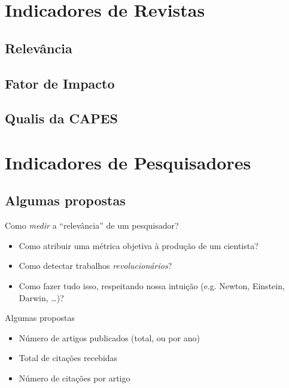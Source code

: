 \documentclass{beamer}
\begin{document}
\section{Indicadores de Revistas}

\subsection{Relevância}

\subsection{Fator de Impacto}

\subsection{Qualis da CAPES}

\section{Indicadores de Pesquisadores}

\subsection{Algumas propostas}

\begin{frame}{Como {\em medir} a ``relevância'' de um pesquisador?}
  \begin{itemize}
  \item Como atribuir uma métrica objetiva à produção de um cientista?
  \item Como detectar trabalhos {\em revolucionários}?
  \item Como fazer tudo isso, respeitando nossa intuição (e.g. Newton, Einstein, Darwin, \ldots)?
  \end{itemize}
\end{frame}

\begin{frame}{Algumas propostas}
  \begin{itemize}
  \item Número de artigos publicados (total, ou por ano)
  \item Total de citações recebidas
  \item Número de citações por artigo
  \end{itemize}
\end{frame}
\end{document}
